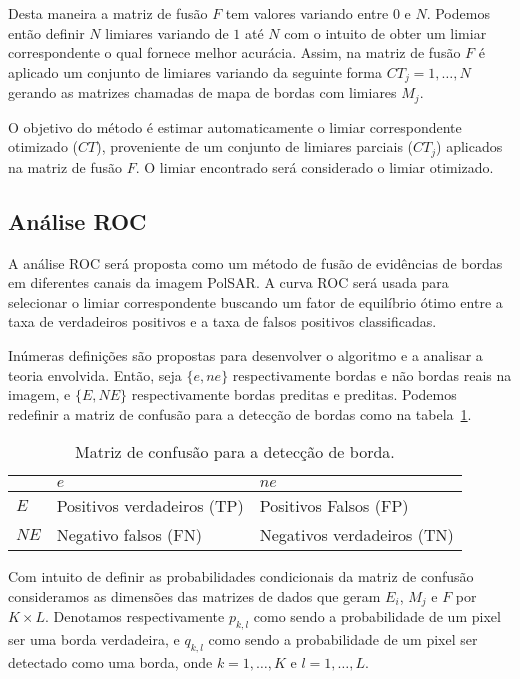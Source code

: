 Desta maneira a matriz de fusão $F$ tem valores variando entre $0$ e $N$. Podemos então definir $N$ limiares variando de $1$ até $N$ com o intuito de obter um limiar correspondente o qual fornece melhor acurácia. Assim, na matriz de fusão $F$ é aplicado um conjunto de limiares variando da seguinte forma  $CT_j=1,\dots,N$ gerando as matrizes chamadas de mapa de bordas com limiares $M_j$.

O objetivo do método é estimar automaticamente o limiar correspondente otimizado ($CT$),  proveniente de um conjunto de limiares parciais ($CT_j$) aplicados na matriz de fusão $F$. O limiar encontrado será considerado o limiar otimizado.  

\subsection{Análise ROC}
	A análise ROC será proposta como um método de fusão de evidências de bordas em diferentes canais da imagem PolSAR. A curva ROC será usada para selecionar o limiar correspondente buscando um fator de equilíbrio ótimo entre a taxa de verdadeiros positivos e a taxa de falsos positivos classificadas.

Inúmeras  definições são propostas para desenvolver o algoritmo e a analisar a teoria envolvida. Então, seja $\{e, ne\}$ respectivamente bordas e não bordas reais na imagem, e $\{E, NE\}$ respectivamente bordas preditas e preditas. 
Podemos redefinir a matriz de confusão para a detecção de bordas como na tabela~\ref{cap_fusao_tab02}.
 
\begin{table}[hbt]
	\centering
	\caption{Matriz de confusão para a detecção de borda.}\label{cap_fusao_tab02}
\begin{tabular}{@{}lll@{}} \toprule
	     & $e$  & $ne$  \\ \midrule
	$E$  & Positivos verdadeiros (TP)& Positivos Falsos (FP)  \\ 
	$NE$ & Negativo falsos (FN)      & Negativos verdadeiros (TN)\\ \bottomrule  
\end{tabular}
\end{table}

Com intuito de definir as probabilidades condicionais da matriz de confusão consideramos as dimensões das matrizes de dados que geram $E_i$, $M_j$ e $F$ por $K\times L$. 
Denotamos respectivamente $p_{k,l}$ como sendo a probabilidade de um pixel ser uma borda verdadeira, e $q_{k,l}$ como sendo a probabilidade de um pixel ser detectado como uma borda, onde $k=1,\dots,K$ e $l=1,\dots,L$. 

